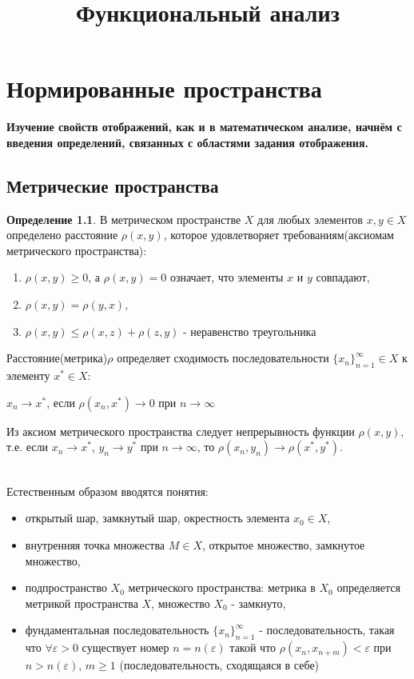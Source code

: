 \documentclass[12pt,a4paper,titlepage]{book}
\title{Функциональный анализ}
\theoremstyle{definition}
\newtheorem{definition}{Определение}
\theoremstyle{plain}
\theoremstyle{remark}
\theoremstyle{plain}
\begin{document}
\chapter{Нормированные пространства}
\par \textbf{Изучение свойств отображений, как и в математическом анализе, начнём с введения определений, связанных с областями задания отображения.}
\section{Метрические пространства}
\begin{definition}В метрическом пространстве $X$ для любых элементов $x,y\in X$ определено расстояние $\rho(x, y)$, которое удовлетворяет требованиям(аксиомам метрического пространства):
 \begin{enumerate}
 \item $\rho(x, y)\geqslant 0$, а $\rho(x, y)=0$ означает, что элементы $x$ и $y$ совпадают,
 \item $\rho(x, y)=\rho(y, x)$,
 \item $ \rho(x, y)\leqslant \rho(x, z) +\rho(z, y)$ - неравенство треугольника
 \end{enumerate} 
\end{definition}
\par Расстояние(метрика)$\rho$ определяет сходимость последовательности $\lbrace x_n \rbrace_{n=1}^{\infty}  \in X$ к элементу $x^{*}\in X$:
\begin{center}
	$x_n\rightarrow x^{*}$, если $\rho(x_n, x^{*})\rightarrow 0$ при $n\rightarrow\infty$
\end{center}
\par Из аксиом метрического пространства следует непрерывность функции $\rho(x, y)$, т.е. если $x_n\rightarrow x^{*}$, $y_n\rightarrow y^{*}$ при $n\rightarrow\infty$, то $\rho(x_n, y_n)\rightarrow \rho(x^*, y^*)$.
\\
\\
\par Естественным образом вводятся понятия:
\begin{itemize}
\item  открытый шар, замкнутый шар, окрестность элемента $x_0\in X$,
\item внутренняя точка множества $M \in X$, открытое множество, замкнутое множество,
\item подпространство $X_0$ метрического пространства: метрика в $X_0$ определяется метрикой пространства $X$, множество $X_0$ - замкнуто,
\item фундаментальная последовательность $\lbrace x_n \rbrace_{n=1}^{\infty}$ - последовательность, такая что $\forall \varepsilon>0$ существует номер $n=n(\varepsilon)$ такой что $\rho(x_n, x_{n+m})<\varepsilon$ при $n>n(\varepsilon)$, $m\geq1$ (последовательность, сходящаяся в себе)
\end{itemize}
\end{document}
